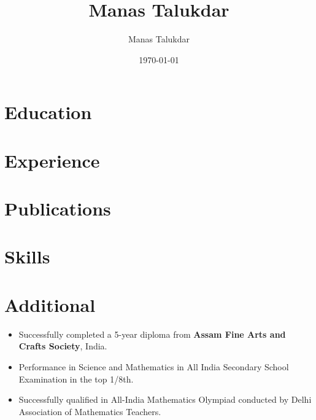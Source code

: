 \documentclass[letterpaper,10pt]{article}
\title{Manas Talukdar}
\author{Manas Talukdar}
\date{\today}
\newcommand{\resumeItemListStart}{\begin{itemize}}
\newcommand{\resumeItemListEnd}{\end{itemize}}
\newcommand{\resumeListItem}[1]{
	\item{#1 \vspace{-6pt}}
}
\begin{document}
\thispagestyle{empty}
	
	

	

	\section{Education}	
	
	

	\section{Experience}
	
	

	

	
	
	
	
	
	
	
	
	
	
		
	
		
	
		

	\section{Publications}
	
	

	\section{Skills}

	
	
	\section{Additional}
	
	\resumeItemListStart
	\resumeListItem {Successfully completed a 5-year diploma from \textbf{Assam Fine Arts and Crafts Society}, India.}
	\resumeListItem {Performance in Science and Mathematics in All India Secondary School Examination in the top 1/8th.}
	\resumeListItem {Successfully qualified in All-India Mathematics Olympiad conducted by Delhi Association of Mathematics Teachers.}
	\resumeItemListEnd
	

\end{document}
